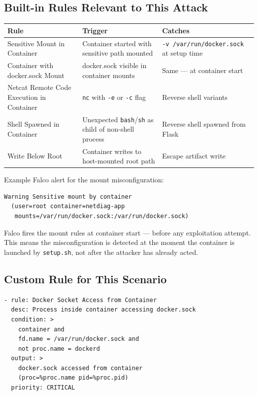 \subsection{Built-in Rules Relevant to This Attack}

\begin{center}
\begin{tabular}{p{4.5cm}p{4cm}p{4.5cm}}
\hline
\textbf{Rule} & \textbf{Trigger} & \textbf{Catches} \\
\hline
Sensitive Mount in Container & Container started with sensitive path mounted & \texttt{-v /var/run/docker.sock} at setup time \\
Container with docker.sock Mount & docker.sock visible in container mounts & Same --- at container start \\
Netcat Remote Code Execution in Container & \texttt{nc} with \texttt{-e} or \texttt{-c} flag & Reverse shell variants \\
Shell Spawned in Container & Unexpected \texttt{bash}/\texttt{sh} as child of non-shell process & Reverse shell spawned from Flask \\
Write Below Root & Container writes to host-mounted root path & Escape artifact write \\
\hline
\end{tabular}
\end{center}

Example Falco alert for the mount misconfiguration:

\begin{lstlisting}
Warning Sensitive mount by container
  (user=root container=netdiag-app
   mounts=/var/run/docker.sock:/var/run/docker.sock)
\end{lstlisting}

Falco fires the mount rules at container start --- before any exploitation attempt. This means the misconfiguration is detected at the moment the container is launched by \texttt{setup.sh}, not after the attacker has already acted.

\subsection{Custom Rule for This Scenario}

\begin{lstlisting}
- rule: Docker Socket Access from Container
  desc: Process inside container accessing docker.sock
  condition: >
    container and
    fd.name = /var/run/docker.sock and
    not proc.name = dockerd
  output: >
    docker.sock accessed from container
    (proc=%proc.name pid=%proc.pid)
  priority: CRITICAL
\end{lstlisting}


